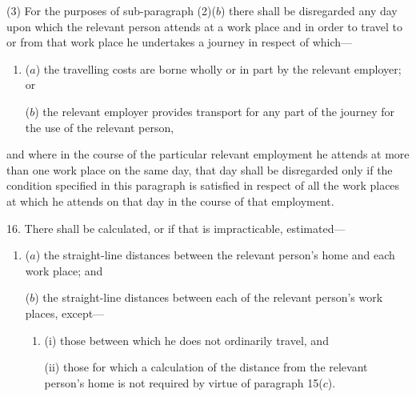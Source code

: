 \documentclass[12pt,a4paper]{article}
\begin{document}
(3) For the purposes of sub-paragraph (2)($b$) there shall be disregarded any day upon which the relevant person attends at a work place and in order to travel to or from that work place he undertakes a journey in respect of which—
\begin{enumerate}\item[]
($a$) the travelling costs are borne wholly or in part by the relevant employer; or

($b$) the relevant employer provides transport for any part of the journey for the use of the relevant person,
\end{enumerate}
and where in the course of the particular relevant employment he attends at more than one work place on the same day, that day shall be disregarded only if the condition specified in this paragraph is satisfied in respect of all the work places at which he attends on that day in the course of that employment.

\medskip

16.  There shall be calculated, or if that is impracticable, estimated—
\begin{enumerate}\item[]
($a$) the straight-line distances between the relevant person’s home and each work place; and

($b$) the straight-line distances between each of the relevant person’s work places, except—
\begin{enumerate}\item[]
(i) those between which he does not ordinarily travel, and

(ii) those for which a calculation of the distance from the relevant person’s home is not required by virtue of paragraph 15($c$).
\end{enumerate}
\end{enumerate}

\medskip

\end{document}

